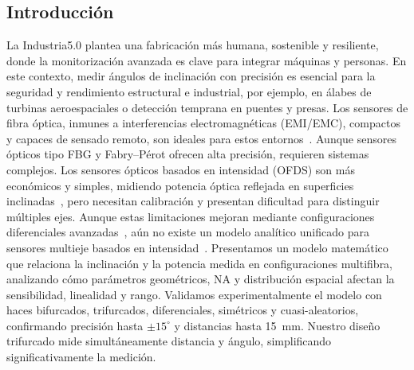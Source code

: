 \documentclass[11pt,a4paper]{article}
\begin{document}
\vspace{-1\baselineskip} %
\begin{multicols}{2}
\section{Introducción}
La Industria5.0 plantea una fabricación más humana, sostenible y resiliente, donde la monitorización avanzada es clave para integrar máquinas y personas\cite{european_commission_industry5_2021}. En este contexto, medir ángulos de inclinación con precisión es esencial para la seguridad y rendimiento estructural e industrial, por ejemplo, en álabes de turbinas aeroespaciales o detección temprana en puentes y presas. Los sensores de fibra óptica, inmunes a interferencias electromagnéticas (EMI/EMC), compactos y capaces de sensado remoto, son ideales para estos entornos~\cite{Sharbirin2019,Wang2023}. Aunque sensores ópticos tipo FBG y Fabry–Pérot ofrecen alta precisión, requieren sistemas complejos. Los sensores ópticos basados en intensidad (OFDS) son más económicos y simples, midiendo potencia óptica reflejada en superficies inclinadas~\cite{zubia_high-performance_2025,zubia_design_2024,zubia_algorithm_2022}, pero necesitan calibración y presentan dificultad para distinguir múltiples ejes. Aunque estas limitaciones mejoran mediante configuraciones diferenciales avanzadas~\cite{Vadapalli2021}, aún no existe un modelo analítico unificado para sensores multieje basados en intensidad~\cite{shimizu_optical_2019}. Presentamos un modelo matemático que relaciona la inclinación y la potencia medida en configuraciones multifibra, analizando cómo parámetros geométricos, NA y distribución espacial afectan la sensibilidad, linealidad y rango. Validamos experimentalmente el modelo con haces bifurcados, trifurcados, diferenciales, simétricos y cuasi-aleatorios, confirmando precisión hasta $\pm15^\circ$ y distancias hasta 15~mm. Nuestro diseño trifurcado mide simultáneamente distancia y ángulo, simplificando significativamente la medición.

\end{multicols}
\end{document}
